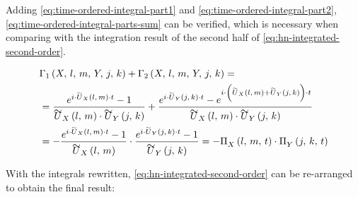 Adding \autoref{eq:time-ordered-integral-part1} and \autoref{eq:time-ordered-integral-part2}, \autoref{eq:time-ordered-integral-parts-sum} can be verified, which is necessary when comparing with the integration result of the second half of \autoref{eq:hn-integrated-second-order}.

\begin{equation}
    \label{eq:time-ordered-integral-parts-sum}
    \begin{split}
        &\Gamma_1 \left(X,\,l,\,m,\,Y,\,j,\,k\right) + \Gamma_2 \left(X,\,l,\,m,\,Y,\,j,\,k\right) = \\
        &=
        \frac{
            e^{
                i \cdot \ueps{$X$}{l}{m} \cdot t
            }
            -1
        }{
            \ueps{$X$}{l}{m} \cdot\ueps{$Y$}{j}{k}
        }
         + 
        \frac{
            e^{
                i \cdot \ueps{$Y$}{j}{k} \cdot t
            }
            -
            e^{
                i \cdot \left(\ueps{$X$}{l}{m} + \ueps{$Y$}{j}{k} \right) \cdot t
            }
        }{
            \ueps{$X$}{l}{m} \cdot\ueps{$Y$}{j}{k}
        } \\
        & = 
        -\frac{
            e^{
                i \cdot \ueps{$X$}{l}{m} \cdot t
            }
            -
            1
        }{
            \ueps{$X$}{l}{m}
        }
        \cdot 
        \frac{
            e^{
                i \cdot \ueps{$Y$}{j}{k} \cdot t
            }
            -
            1
        }{
            \ueps{$Y$}{j}{k}
        }
         = 
         - \VhamiltonianAnalyticalPartIntegrated{$X$}{l}{m}{t} 
         \cdot
         \VhamiltonianAnalyticalPartIntegrated{$Y$}{j}{k}{t}
    \end{split}
\end{equation}

With the integrals rewritten, \autoref{eq:hn-integrated-second-order} can be re-arranged to obtain the final result: 

